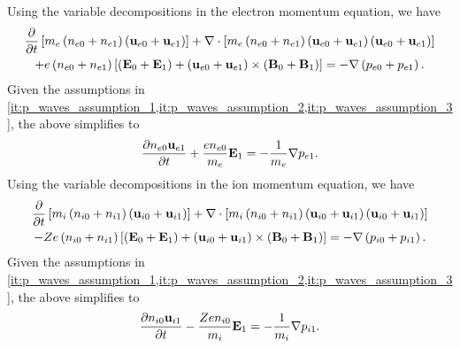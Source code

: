 \documentclass[a4paper,11pt]{report}
\begin{document}
Using the variable decompositions in the electron momentum equation, we have 
\begin{multline*}
    \frac{\partial}{\partial t} \left [ m_e \left ( n_{e0} + n_{e1} \right ) \left ( \mathbf{u}_{e0} + \mathbf{u}_{e1} \right ) \right ] + \nabla \cdot \left [ m_e \left ( n_{e0} + n_{e1} \right ) \left ( \mathbf{u}_{e0} + \mathbf{u}_{e1} \right ) \left ( \mathbf{u}_{e0} + \mathbf{u}_{e1} \right ) \right ] \\
    + e \left ( n_{e0} + n_{e1} \right ) \left [ \left ( \mathbf{E}_0 + \mathbf{E}_1 \right ) + \left ( \mathbf{u}_{e0} + \mathbf{u}_{e1} \right ) \times \left ( \mathbf{B}_0 + \mathbf{B}_1 \right ) \right ] = -\nabla \left ( p_{e0} + p_{e1} \right ).
\end{multline*}
Given the assumptions in \cref{it:p_waves_assumption_1,it:p_waves_assumption_2,it:p_waves_assumption_3}, the above simplifies to
\begin{equation}
    \label{eq:p_waves_e_mom_linearized}
    \frac{\partial n_{e0} \mathbf{u}_{e1}}{\partial t} + \frac{e n_{e0}}{m_e} \mathbf{E}_1 = - \frac{1}{m_e} \nabla p_{e1} .
\end{equation}
Using the variable decompositions in the ion momentum equation, we have 
\begin{multline*}
    \frac{\partial}{\partial t} \left [ m_i \left ( n_{i0} + n_{i1} \right ) \left ( \mathbf{u}_{i0} + \mathbf{u}_{i1} \right ) \right ] + \nabla \cdot \left [ m_i \left ( n_{i0} + n_{i1} \right ) \left ( \mathbf{u}_{i0} + \mathbf{u}_{i1} \right ) \left ( \mathbf{u}_{i0} + \mathbf{u}_{i1} \right ) \right ] \\
    - Z e \left ( n_{i0} + n_{i1} \right ) \left [ \left ( \mathbf{E}_0 + \mathbf{E}_1 \right ) + \left ( \mathbf{u}_{i0} + \mathbf{u}_{i1} \right ) \times \left ( \mathbf{B}_0 + \mathbf{B}_1 \right ) \right ] = -\nabla \left ( p_{i0} + p_{i1} \right ).
\end{multline*}
Given the assumptions in \cref{it:p_waves_assumption_1,it:p_waves_assumption_2,it:p_waves_assumption_3}, the above simplifies to
\begin{equation}
    \label{eq:p_waves_i_mom_linearized}
    \frac{\partial n_{i0} \mathbf{u}_{i1}}{\partial t} - \frac{Z e n_{i0}}{m_i} \mathbf{E}_1 = - \frac{1}{m_i}\nabla p_{i1}.
\end{equation}
\end{document}
